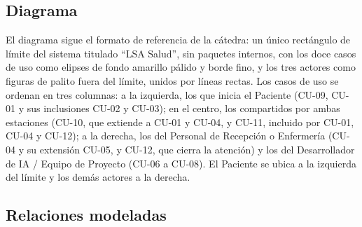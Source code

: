 \subsection{Diagrama}

El diagrama sigue el formato de referencia de la cátedra: un único
rectángulo de límite del sistema titulado ``LSA Salud'', sin paquetes
internos, con los doce casos de uso como elipses de fondo amarillo pálido y
borde fino, y los tres actores como figuras de palito fuera del límite,
unidos por líneas rectas. Los casos de uso se ordenan en tres columnas: a la
izquierda, los que inicia el Paciente (CU-09, CU-01 y sus inclusiones CU-02
y CU-03); en el centro, los compartidos por ambas estaciones (CU-10, que
extiende a CU-01 y CU-04, y CU-11, incluido por CU-01, CU-04 y CU-12); a la
derecha, los del Personal de Recepción o Enfermería (CU-04 y su extensión
CU-05, y CU-12, que cierra la atención) y los del Desarrollador de IA /
Equipo de Proyecto (CU-06 a CU-08). El Paciente se ubica a la izquierda del
límite y los demás actores a la derecha.


\subsection{Relaciones modeladas}

